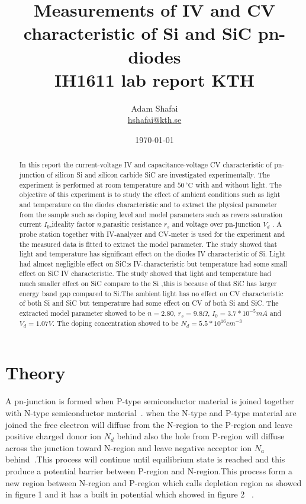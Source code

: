 \documentclass[letterpaper,12pt]{article}
\begin{document}
\title{Measurements of IV and CV characteristic of Si and SiC pn-diodes\\
IH1611 lab report KTH}
\author{Adam Shafai\\ \href{mailto:hshafai@kth.se}{hshafai@kth.se}}



\date{\today}
\clearpage
\maketitle
\thispagestyle{empty}

\newpage
\tableofcontents
\newpage
\begin{abstract}
In this report the current-voltage IV and capacitance-voltage CV characteristic of pn-junction of silicon Si and silicon carbide SiC are investigated experimentally. The experiment is performed at room temperature and $50\,^{\circ}\mathrm{C}$ with and without light. The objective of this experiment is to study the effect of ambient conditions such as light and temperature on the diodes characteristic and to extract the physical parameter from the sample such as doping level and model parameters such as revers saturation current $I_0$,ideality factor $n$,parasitic resistance $r_s$ and voltage over pn-junction $V_d$ . A probe station together with IV-analyzer and CV-meter is used for the experiment and the measured data is fitted to extract the model parameter. The study showed that light and temperature has significant effect on the diodes IV characteristic of Si. Light had almost negligible effect on SiC:s IV-characteristic but temperature had some small effect on SiC IV characteristic. The study showed that light and temperature had much smaller effect on SiC compare to the Si ,this is because of that SiC has larger energy band gap compared to Si.The ambient light has no effect on CV characteristic of both Si and SiC but temperature had some effect on CV of both Si and SiC. The extracted model parameter showed to be $ n = 2.80$, $r_s = 9.8\Omega$, $I_0 = 3.7*10^{-5} mA$ and $V_d = 1.07V$.
The doping concentration showed to be $N_d = 5.5*10^{16} cm^{-3}$
\end{abstract} 


\section{Theory}
A pn-junction is formed when P-type semiconductor material is joined together with N-type semiconductor material~\cite{hu}. when the N-type and P-type material are joined the free electron will  diffuse from the N-region to the P-region and leave positive charged donor ion $N_d$ behind also the hole from P-region will diffuse across the junction toward N-region and leave negative acceptor ion $N_a$ behind~\cite{elec}.This process will continue until equilibrium state is reached and this produce a potential barrier between P-region and N-region.This process form a new region between N-region and
P-region which calls depletion region as showed in figure 1 and it has a built in potential which showed in figure 2 ~\cite{elec}.
\end{document}
